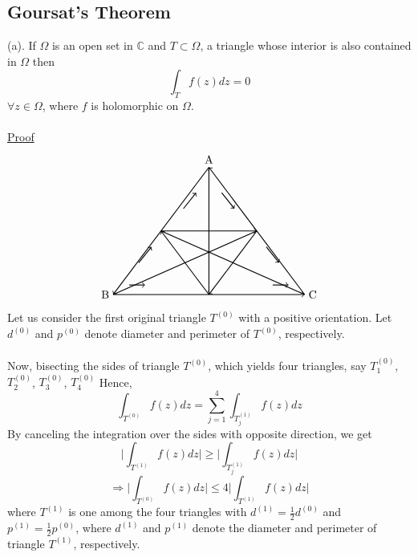 \documentclass{article}
\begin{document}
\subsection{Goursat's Theorem}
(a). If $\Omega$ is an open set in $\mathbb{C}$ and $T\subset\Omega$, a triangle whose interior is also contained in $\Omega$ then
\[
\int_{T}f(z) dz=0  
\]
$\forall z\in\Omega$, where $f$ is holomorphic on $\Omega$.
\\
\\
\underline{Proof}
\[
\begin{tikzpicture}
    \coordinate (A) at (0,4);
    \coordinate (B) at (-3,0);
    \coordinate (C) at (3,0);
    
    \coordinate (AB) at (-1.5,2);
    \coordinate (AC) at (1.5,2);
    \coordinate (BC) at (0,0);
    
    \coordinate (M) at (0,2);
    \coordinate (N) at (-1.5,1);
    \coordinate (O) at (1.5,1);
    
    \draw[thick, ->] (B) -- (C);
    \draw[thick, ->] (C) -- (A);
    \draw[thick, ->] (A) -- (B);
    
    \draw[thick, ->] (AB) -- (AC);
    \draw[thick, ->] (AC) -- (BC);
    \draw[thick, ->] (BC) -- (AB);
    
    \draw[thick] (A) -- (BC);
    \draw[thick] (B) -- (AC);
    \draw[thick] (C) -- (AB);
    
    \draw[thick,->] (-2.2,1) -- (-1.8,1.5);
    \draw[thick,->] (-0.8,2.7) -- (-0.4,3.2);
    \draw[thick,->] (1.8,1.5) -- (2.2,1);
    \draw[thick,->] (0.4,3.2) -- (0.8,2.7);
    \draw[thick,->] (-2.5,0.3) -- (-2.0,0.3);
    \draw[thick,->] (2.0,0.3) -- (2.5,0.3);

    \node[above] at (A) {A};
    \node[left] at (B) {B};
    \node[right] at (C) {C};
\end{tikzpicture}
\]
Let us consider the first original triangle $T^{(0)}$ with a positive orientation. Let $d^{(0)}$ and $p^{(0)}$ denote diameter and perimeter of $T^{(0)}$, respectively.
\\
\\
Now, bisecting the sides of triangle $T^{(0)}$, which yields four triangles, say $T^{(0)}_1$, $T^{(0)}_2$, $T^{(0)}_3$, $T^{(0)}_4$
Hence,
\[
\int_{T^{(0)}}f(z)dz=\sum_{j=1}^{4}\int_{T^{(1)}_j}f(z)dz
\]
By canceling the integration over the sides with opposite direction, we get
\[
\Big|\int_{T^{(1)}}f(z)dz\Big|\geq\Big|\int_{T^{(1)}_j}f(z)dz\Big|
\]
\[
\Rightarrow \Big|\int_{T^{(0)}}f(z)dz\Big|\leq4\Big|\int_{T^{(1)}}f(z)dz\Big|
\]
where $T^{(1)}$ is one among the four triangles with $d^{(1)}=\frac{1}{2}d^{(0)}$ and $p^{(1)}=\frac{1}{2}p^{(0)}$, where $d^{(1)}$ and $p^{(1)}$ denote the diameter and perimeter of triangle $T^{(1)}$, respectively.
\end{document}
